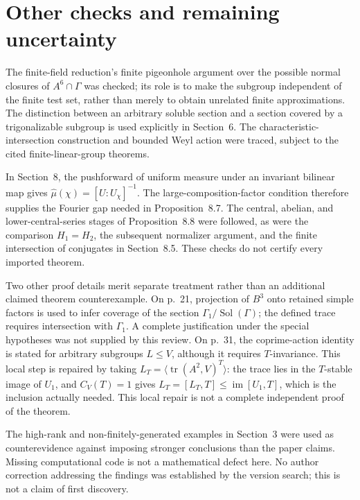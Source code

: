 \documentclass[10pt]{article}
\begin{document}
\section*{Other checks and remaining uncertainty}
The finite-field reduction’s finite pigeonhole argument over the possible normal closures of \(A^6\cap\Gamma\) was checked; its role is to make the subgroup independent of the finite test set, rather than merely to obtain unrelated finite approximations. The distinction between an arbitrary soluble section and a section covered by a trigonalizable subgroup is used explicitly in Section 6. The characteristic-intersection construction and bounded Weyl action were traced, subject to the cited finite-linear-group theorems.\par
In Section 8, the pushforward of uniform measure under an invariant bilinear map gives \(\widehat\mu(\chi)=[U:U_\chi]^{-1}\). The large-composition-factor condition therefore supplies the Fourier gap needed in Proposition 8.7. The central, abelian, and lower-central-series stages of Proposition 8.8 were followed, as were the comparison \(H_1=H_2\), the subsequent normalizer argument, and the finite intersection of conjugates in Section 8.5. These checks do not certify every imported theorem.\par
Two other proof details merit separate treatment rather than an additional claimed theorem counterexample. On p. 21, projection of \(B^3\) onto retained simple factors is used to infer coverage of the section \(\Gamma_1/\operatorname{Sol}(\Gamma)\); the defined trace requires intersection with \(\Gamma_1\). A complete justification under the special hypotheses was not supplied by this review. On p. 31, the coprime-action identity is stated for arbitrary subgroups \(L\le V\), although it requires \(T\)-invariance. This local step is repaired by taking \(L_T=\langle\operatorname{tr}(A^2,V)^T\rangle\): the trace lies in the \(T\)-stable image of \(U_1\), and \(C_V(T)=1\) gives \(L_T=[L_T,T]\le\operatorname{im}[U_1,T]\), which is the inclusion actually needed. This local repair is not a complete independent proof of the theorem.\par
The high-rank and non-finitely-generated examples in Section 3 were used as counterevidence against imposing stronger conclusions than the paper claims. Missing computational code is not a mathematical defect here. No author correction addressing the findings was established by the version search; this is not a claim of first discovery.\par
\end{document}
